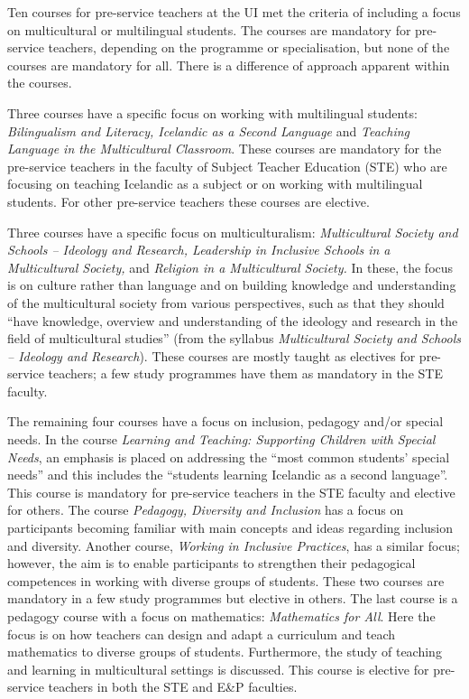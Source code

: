 \documentclass[output=paper]{langscibook}
\begin{document}
Ten courses for pre-service teachers at the UI met the criteria of including a focus on multicultural or multilingual students. The courses are mandatory for pre-service teachers, depending on the programme or specialisation, but none of the courses are mandatory for all. There is a difference of approach apparent within the courses. 

Three courses have a specific focus on working with multilingual students: \textit{Bilingualism and Literacy, Icelandic as a Second Language} and \textit{Teaching Language in the Multicultural Classroom}. These courses are mandatory for the pre-service teachers in the faculty of Subject Teacher Education (STE) who are focusing on teaching Icelandic as a subject or on working with multilingual students. For other pre-service teachers these courses are elective.

Three courses have a specific focus on multiculturalism: \textit{Multicultural Society and Schools – Ideology and Research, Leadership in Inclusive Schools in a Multicultural Society,} and \textit{Religion in a Multicultural Society.} In these, the focus is on culture rather than language and on building knowledge and understanding of the multicultural society from various perspectives, such as that they should “have knowledge, overview and understanding of the ideology and research in the field of multicultural studies” (from the syllabus \textit{Multicultural Society and Schools – Ideology and Research}). These courses are mostly taught as electives for pre-service teachers; a few study programmes have them as mandatory in the STE faculty. 

The remaining four courses have a focus on inclusion, pedagogy and/or special needs. In the course \textit{Learning and Teaching: Supporting Children with Special Needs}, an emphasis is placed on addressing the “most common students’ special needs” and this includes the “students learning Icelandic as a second language”. This course is mandatory for pre-service teachers in the STE faculty and elective for others. The course \textit{Pedagogy, Diversity and Inclusion} has a focus on participants becoming familiar with main concepts and ideas regarding inclusion and diversity. Another course, \textit{Working in Inclusive Practices}, has a similar focus; however, the aim is to enable participants to strengthen their pedagogical competences in working with diverse groups of students. These two courses are mandatory in a few study programmes but elective in others. The last course is a pedagogy course with a focus on mathematics: \textit{Mathematics for All}. Here the focus is on how teachers can design and adapt a curriculum and teach mathematics to diverse groups of students. Furthermore, the study of teaching and learning in multicultural settings is discussed. This course is elective for pre-service teachers in both the STE and E\&P faculties.
\end{document}
